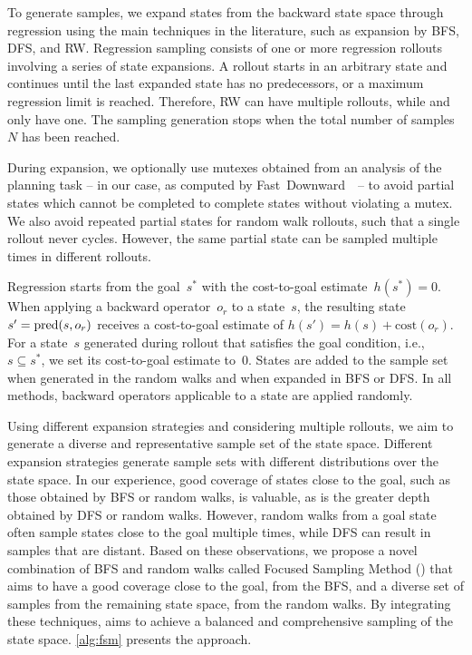 To generate samples, we expand states from the backward state space through regression using the main techniques in the literature, such as expansion by BFS, DFS, and RW. Regression sampling consists of one or more regression rollouts involving a series of state expansions. A rollout starts in an arbitrary state and continues until the last expanded state has no predecessors, or a maximum regression limit is reached. Therefore, RW can have multiple rollouts, while \bfs and \dfs only have one. The sampling generation stops when the total number of samples $N$ has been reached.

During expansion, we optionally use mutexes obtained from an analysis of the planning task -- in our case, as computed by Fast~Downward~\cite{helmert2006fast}~-- to avoid partial states which cannot be completed to complete states without violating a mutex. We also avoid repeated partial states for random walk rollouts, such that a single rollout never cycles. However, the same partial state can be sampled multiple times in different rollouts.

Regression starts from the goal~$s^*$ with the cost-to-goal estimate~$h(s^*)=0$. When applying a backward operator~$o_r$ to a state~$s$, the resulting state~$s' = \operatorname{pred}(s, o_r)$ receives a cost-to-goal estimate of $h(s') = h(s) + \text{cost}(o_r)$. For a state~$s$ generated during rollout that satisfies the goal condition, i.e.,~$s \subseteq s^*$, we set its cost-to-goal estimate to~$0$. States are added to the sample set when generated in the random walks and when expanded in BFS or DFS. In all methods, backward operators applicable to a state are applied randomly.

Using different expansion strategies and considering multiple rollouts, we aim to generate a diverse and representative sample set of the state space. Different expansion strategies generate sample sets with different distributions over the state space. In our experience, good coverage of states close to the goal, such as those obtained by BFS or random walks, is valuable, as is the greater depth obtained by DFS or random walks. However, random walks from a goal state often sample states close to the goal multiple times, while DFS can result in samples that are distant. Based on these observations, we propose a novel combination of BFS and random walks called Focused Sampling Method (\bfsrw) that aims to have a good coverage close to the goal, from the BFS, and a diverse set of samples from the remaining state space, from the random walks. By integrating these techniques, \bfsrw aims to achieve a balanced and comprehensive sampling of the state space. \cref{alg:fsm} presents the approach.

